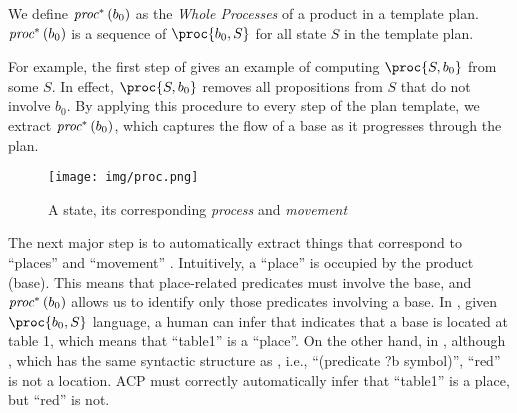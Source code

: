 \begin{defi}

We define $\mbox{$\mbox{\it proc}^*$}\left(b_0\right)$ as the {\em Whole Processes} of a product in a template plan.
$\mbox{$\mbox{\it proc}^*$}\left(b_0\right)$ is a sequence of $\proc{b_0,S}$ for all state $S$ in the template plan.




\end{defi}

For example, the first step of  gives an example of
computing $\proc{S,b_0}$ from some $S$.  In effect, $\proc{S,b_0}$
removes all propositions from $S$ that do not involve $b_0$.  By
applying this procedure to every step of the plan template, we extract
$\mbox{$\mbox{\it proc}^*$}\left(b_0\right)$, which captures the flow of a base as it progresses
through the plan.


\begin{figure}
 \centering
 \texttt{[image: img/proc.png]}
 \caption{{\small A state, its corresponding {\em process} and {\em movement}}}
 \label{proc}
\end{figure}

The next major step is to automatically extract things that correspond to ``places'' and ``movement''
. Intuitively, a ``place'' is occupied by the product (base).
This means that place-related predicates must involve the base, and $\mbox{$\mbox{\it proc}^*$}\left(b_0\right)$ allows us to identify only those predicates involving a base.
%
In , given $\proc{b_0,S}$ %
language, a human can infer that  indicates that a
base is located at table 1, which means that ``table1'' is a
``place''.  On the other hand, in , although , which has the same
syntactic structure as , i.e., ``(predicate ?b
symbol)'', ``red'' is not a location. 
ACP must correctly  automatically infer that ``table1'' is a place, but ``red'' is not.




